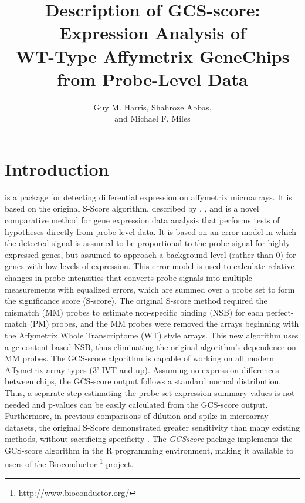 \documentclass[12pt]{article}
\author{Guy M. Harris, Shahroze Abbas,\\ and Michael F. Miles}
\newcommand{\Rpackage}[1]{{\textit{#1}}}
\begin{document}

\title{Description of GCS-score: Expression Analysis of \\ WT-Type Affymetrix GeneChips \\ from Probe-Level Data}

\maketitle
\tableofcontents
\newpage
\section{Introduction}
 is a \Bioconductor{} package for detecting differential expression on affymetrix microarrays. It is based on the original S-Score algorithm, described by \cite{zhang2002}, \cite{kerns2003}, and \cite{kennedy2006b} is a novel comparative method for gene expression data analysis that performs tests of hypotheses directly from probe level data. It is based on an error model in which the detected signal is assumed to be proportional to the probe signal for highly expressed genes, but assumed to approach a background level (rather than 0) for genes with low levels of expression. This error model is used to calculate relative changes in probe intensities that converts probe signals into multiple measurements with equalized errors, which are summed over a probe set to form the significance score (S-score).  The original S-score method required the mismatch (MM) probes to estimate non-specific binding (NSB) for each perfect-match (PM) probes, and the MM probes were removed the arrays beginning with the Affymetrix Whole Transcriptome (WT) style arrays. This new algorithm uses a gc-content based NSB, thus eliminating the original algorithm's dependence on MM probes.  The GCS-score algorithm is capable of working on all modern Affymetrix array types (3' IVT and up). Assuming no expression differences between chips, the GCS-score output follows a standard normal distribution. Thus, a separate step estimating the probe set expression summary values is not needed and p-values can be easily calculated from the GCS-score output. Furthermore, in previous comparisons of dilution and spike-in microarray datasets, the original S-Score demonstrated greater sensitivity than many existing methods, without sacrificing specificity \citep{kennedy2006}. The \Rpackage{GCSscore} package \citep{harris2019} implements the GCS-score algorithm in the R programming environment, making it available to users of the Bioconductor \footnote{\url{http://www.bioconductor.org/}} project.
\end{document}
